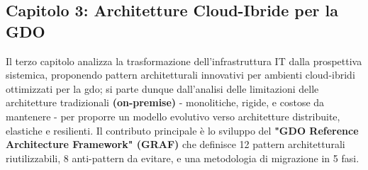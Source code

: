 
      
      



\subsection{\texorpdfstring{\textbf{Capitolo 3: Architetture Cloud-Ibride per la GDO}}{1.6.2 - Capitolo 3: Architetture Cloud-Ibride per la GDO}}

\label{ssec:struttura_cap3}
Il terzo capitolo analizza la trasformazione dell'infrastruttura IT dalla prospettiva sistemica, proponendo pattern architetturali innovativi per ambienti cloud-ibridi ottimizzati per la \gls{gdo}; si parte dunque dall'analisi delle limitazioni delle architetture tradizionali \textbf{(on-premise)} - monolitiche, rigide, e costose da mantenere - per proporre un modello evolutivo verso architetture distribuite, elastiche e resilienti. Il contributo principale è lo sviluppo del \textbf{"GDO Reference Architecture Framework" (GRAF)} che definisce 12 pattern architetturali riutilizzabili, 8 anti-pattern da evitare, e una metodologia di migrazione in 5 fasi.

